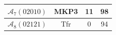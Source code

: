 \begin{table}[!t]
\begin{tabular}{|c|c||c|c|}
\\ \hline

$\mathcal{A}_{7}(02010)$

&

MKP3


&

11

&

98

\\ \hline

$\mathcal{A}_{8}(02121)$

&

Tfr


&

0

&

94

\\ \hline

 
\end{tabular}
\end{table}








%
%



